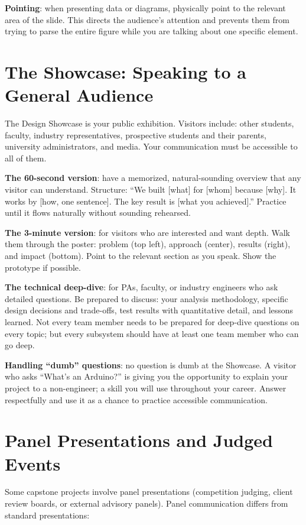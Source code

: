 \textbf{Pointing}: when presenting data or diagrams, physically point to the relevant area of the slide. This directs the audience's attention and prevents them from trying to parse the entire figure while you are talking about one specific element.



\section{The Showcase: Speaking to a General Audience}
The Design Showcase is your public exhibition. Visitors include: other students, faculty, industry representatives, prospective students and their parents, university administrators, and media. Your communication must be accessible to all of them.

\textbf{The 60-second version}: have a memorized, natural-sounding overview that any visitor can understand. Structure: ``We built [what] for [whom] because [why]. It works by [how, one sentence]. The key result is [what you achieved].'' Practice until it flows naturally without sounding rehearsed.

\textbf{The 3-minute version}: for visitors who are interested and want depth. Walk them through the poster: problem (top left), approach (center), results (right), and impact (bottom). Point to the relevant section as you speak. Show the prototype if possible.

\textbf{The technical deep-dive}: for PAs, faculty, or industry engineers who ask detailed questions. Be prepared to discuss: your analysis methodology, specific design decisions and trade-offs, test results with quantitative detail, and lessons learned. Not every team member needs to be prepared for deep-dive questions on every topic; but every subsystem should have at least one team member who can go deep.

\textbf{Handling ``dumb'' questions}: no question is dumb at the Showcase. A visitor who asks ``What's an Arduino?'' is giving you the opportunity to explain your project to a non-engineer; a skill you will use throughout your career. Answer respectfully and use it as a chance to practice accessible communication.

\section{Panel Presentations and Judged Events}
Some capstone projects involve panel presentations (competition judging, client review boards, or external advisory panels). Panel communication differs from standard presentations:

